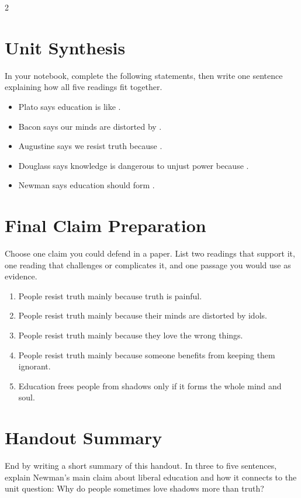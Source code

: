 \documentclass[12pt]{article}
\begin{document}
\begin{multicols}{2}
\section*{Unit Synthesis}
In your notebook, complete the following statements, then write one sentence explaining how all five readings fit together.
\begin{itemize}[leftmargin=*]
\item Plato says education is like \underline{\hspace{0.7in}}.
\item Bacon says our minds are distorted by \underline{\hspace{0.7in}}.
\item Augustine says we resist truth because \underline{\hspace{0.7in}}.
\item Douglass says knowledge is dangerous to unjust power because \underline{\hspace{0.7in}}.
\item Newman says education should form \underline{\hspace{0.7in}}.
\end{itemize}

\section*{Final Claim Preparation}
Choose one claim you could defend in a paper. List two readings that support it, one reading that challenges or complicates it, and one passage you would use as evidence.
\begin{enumerate}[leftmargin=*]
\item People resist truth mainly because truth is painful.
\item People resist truth mainly because their minds are distorted by idols.
\item People resist truth mainly because they love the wrong things.
\item People resist truth mainly because someone benefits from keeping them ignorant.
\item Education frees people from shadows only if it forms the whole mind and soul.
\end{enumerate}

\section*{Handout Summary}
End by writing a short summary of this handout. In three to five sentences, explain Newman's main claim about liberal education and how it connects to the unit question: Why do people sometimes love shadows more than truth?

\end{multicols}
\end{document}
